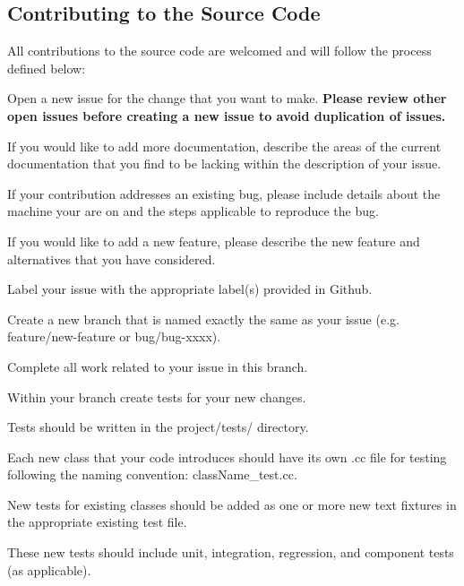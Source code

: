 \subsection*{Contributing to the Source Code}

All contributions to the source code are welcomed and will follow the process defined below\+:
\begin{DoxyEnumerate}
\item Open a new issue for the change that you want to make. {\bfseries Please review other open issues before creating a new issue to avoid duplication of issues.}
\begin{DoxyItemize}
\item If you would like to add more documentation, describe the areas of the current documentation that you find to be lacking within the description of your issue.
\item If your contribution addresses an existing bug, please include details about the machine your are on and the steps applicable to reproduce the bug.
\item If you would like to add a new feature, please describe the new feature and alternatives that you have considered.
\item Label your issue with the appropriate label(s) provided in Github.
\end{DoxyItemize}
\item Create a new branch that is named exactly the same as your issue (e.\+g. {\ttfamily feature/new-\/feature} or {\ttfamily bug/bug-\/xxxx}).
\begin{DoxyItemize}
\item Complete all work related to your issue in this branch.
\end{DoxyItemize}
\item Within your branch create tests for your new changes.
\begin{DoxyItemize}
\item Tests should be written in the {\ttfamily project/tests/} directory.
\item Each new class that your code introduces should have its own {\ttfamily .cc} file for testing following the naming convention\+: {\ttfamily class\+Name\+\_\+test.\+cc}.
\item New tests for existing classes should be added as one or more new text fixtures in the appropriate existing test file.
\item These new tests should include unit, integration, regression, and component tests (as applicable).

\end{DoxyItemize}
\end{DoxyEnumerate}
